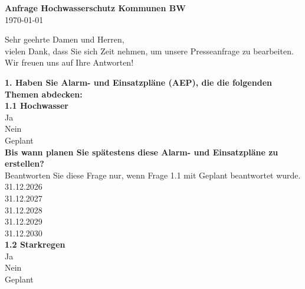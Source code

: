 \documentclass[12pt]{article}
\begin{document}
  \begin{center}
  {\LARGE \textbf{\textcolor{swr_purple}{Anfrage Hochwasserschutz Kommunen BW}}}\\[1em]
  {\large \today}
  \end{center}
  {Sehr geehrte Damen und Herren,\\ vielen Dank, dass Sie sich
  Zeit nehmen, um unsere Presseanfrage zu bearbeiten.\\
  Wir freuen uns auf Ihre Antworten!}

  \vspace{1cm}

  \begin{Form}
  \needspace{5cm}
\large \textbf{\textcolor{swr_purple}{1. Haben Sie Alarm- und Einsatzpläne (AEP), die die folgenden Themen abdecken:}}\normalsize\\[0.5em]

\needspace{5cm}
\large \textbf{\textcolor{swr_purple}{1.1 Hochwasser}}\normalsize\\[0.5em]
\ChoiceMenu[radio, name=q_G01Q02, bordercolor={0.7 0.7 0.7}]{}{= } Ja\\
\ChoiceMenu[radio, name=q_G01Q02, bordercolor={0.7 0.7 0.7}]{}{= } Nein\\
\ChoiceMenu[radio, name=q_G01Q02, bordercolor={0.7 0.7 0.7}]{}{= } Geplant\\

\needspace{5cm}
\large \textbf{\textcolor{swr_purple}{Bis wann planen Sie spätestens diese Alarm- und Einsatzpläne zu erstellen?}}\normalsize\\[0.5em]
 Beantworten Sie diese Frage nur, wenn Frage 1.1 mit Geplant beantwortet wurde.\\[0.5em]
\ChoiceMenu[radio, name=q_G01Q03, bordercolor={0.7 0.7 0.7}]{}{= } 31.12.2026\\
\ChoiceMenu[radio, name=q_G01Q03, bordercolor={0.7 0.7 0.7}]{}{= } 31.12.2027\\
\ChoiceMenu[radio, name=q_G01Q03, bordercolor={0.7 0.7 0.7}]{}{= } 31.12.2028\\
\ChoiceMenu[radio, name=q_G01Q03, bordercolor={0.7 0.7 0.7}]{}{= } 31.12.2029\\
\ChoiceMenu[radio, name=q_G01Q03, bordercolor={0.7 0.7 0.7}]{}{= } 31.12.2030\\

\needspace{5cm}
\large \textbf{\textcolor{swr_purple}{1.2 Starkregen}}\normalsize\\[0.5em]
\ChoiceMenu[radio, name=q_G01Q04, bordercolor={0.7 0.7 0.7}]{}{= } Ja\\
\ChoiceMenu[radio, name=q_G01Q04, bordercolor={0.7 0.7 0.7}]{}{= } Nein\\
\ChoiceMenu[radio, name=q_G01Q04, bordercolor={0.7 0.7 0.7}]{}{= } Geplant\\


\end{Form}
\end{document}
